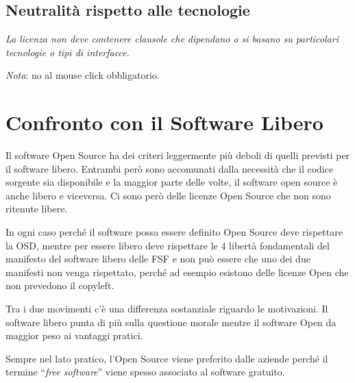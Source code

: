 \subsection{Neutralità rispetto alle tecnologie}

\begin{center}

\textit{La licenza non deve contenere clausole che dipendano o si basano su particolari tecnologie o tipi di interfacce.}

\end{center}

\textit{Nota}: no al mouse click obbligatorio.

\section{Confronto con il Software Libero}

Il software Open Source ha dei criteri leggermente più deboli di quelli previsti per il software libero. Entrambi però sono accomunati dalla necessità che il codice sorgente sia disponibile e la maggior parte delle volte, il software open source è anche libero e viceversa.
Ci sono però delle licenze Open Source che non sono ritenute libere.

In ogni caso perché il software possa essere definito Open Source deve rispettare la OSD, mentre per essere libero deve rispettare le 4 libertà fondamentali del manifesto del software libero delle FSF e non può essere che uno dei due manifesti non venga rispettato, perché ad esempio esistono delle licenze Open che non prevedono il copyleft.

Tra i due movimenti c'è una differenza sostanziale riguardo le motivazioni. Il software libero punta di più sulla questione morale mentre il software Open da maggior peso ai vantaggi pratici.

Sempre nel lato pratico, l'Open Source viene preferito dalle aziende perché il termine ``\textit{free software}'' viene spesso associato al software gratuito.

